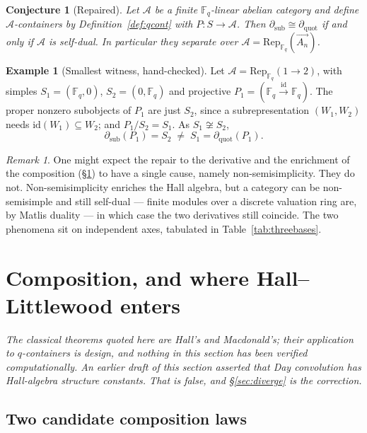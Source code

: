 \documentclass[11pt,a4paper]{article}
\newtheorem{conjecture}[theorem]{Conjecture}
\theoremstyle{definition}
\newtheorem{example}[theorem]{Example}
\theoremstyle{remark}
\newtheorem{remark}[theorem]{Remark}
\newcommand{\FF}{\mathbb{F}}
\newcommand{\Rep}{\mathrm{Rep}}
\begin{document}
\begin{conjecture}[Repaired]\label{conj:repaired}
Let $\mathcal{A}$ be a finite $\FF_q$-linear abelian category and define
$\mathcal{A}$-containers by Definition~\ref{def:qcont} with
$P : S \to \mathcal{A}$. Then $\partial_{\mathrm{sub}} \cong
\partial_{\mathrm{quot}}$ if and only if $\mathcal{A}$ is self-dual. In
particular they separate over $\mathcal{A} = \Rep_{\FF_q}(\vec{A_n})$.
\end{conjecture}

\begin{example}[Smallest witness, hand-checked]
Let $\mathcal{A} = \Rep_{\FF_q}(1 \to 2)$, with simples $S_1 = (\FF_q, 0)$,
$S_2 = (0, \FF_q)$ and projective $P_1 = (\FF_q \xrightarrow{\ \mathrm{id}\ } \FF_q)$.
The proper nonzero subobjects of $P_1$ are just $S_2$, since a subrepresentation
$(W_1, W_2)$ needs $\mathrm{id}(W_1) \subseteq W_2$; and $P_1/S_2 = S_1$. As
$S_1 \not\cong S_2$,
\[
  \partial_{\mathrm{sub}}(P_1) = S_2 \;\ne\; S_1 = \partial_{\mathrm{quot}}(P_1).
\]
\end{example}

\begin{remark}
One might expect the repair to the derivative and the enrichment of the
composition (\S\ref{sec:hall}) to have a single cause, namely non-semisimplicity.
They do not. Non-semisimplicity enriches the Hall algebra, but a category can be
non-semisimple and still self-dual --- finite modules over a discrete valuation
ring are, by Matlis duality --- in which case the two derivatives still coincide.
The two phenomena sit on independent axes, tabulated in
Table~\ref{tab:threebases}.
\end{remark}

\section{Composition, and where Hall--Littlewood enters}\label{sec:hall}

\emph{The classical theorems quoted here are Hall's and Macdonald's; their
application to $q$-containers is design, and nothing in this section has been
verified computationally. An earlier draft of this section asserted that Day
convolution has Hall-algebra structure constants. That is false, and
\S\ref{sec:diverge} is the correction.}

\subsection{Two candidate composition laws}
\end{document}
